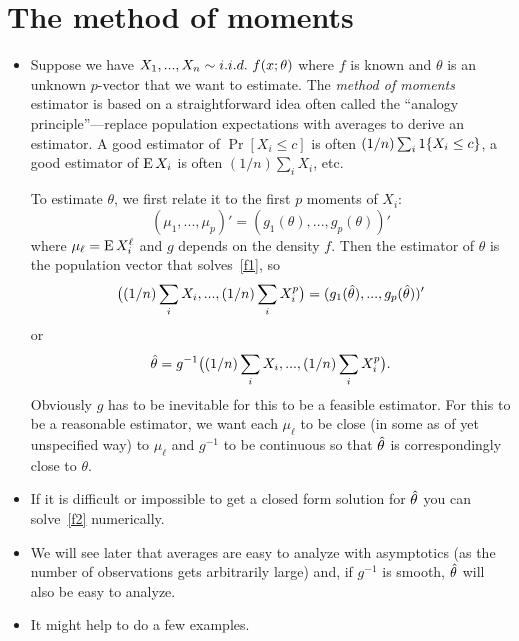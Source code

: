 \section{The method of moments}

\begin{itemize}
\item Suppose we have $X_1,...,X_n \sim \iid\ f(x; \theta)$ where $f$ is known
  and $\theta$ is an unknown $p$-vector that we want to estimate.  The
  \emph{method of moments} estimator is based on a straightforward
  idea often called the ``analogy principle''---replace population
  expectations with averages to derive an estimator.  A good estimator
  of $\Pr[X_i \leq c]$ is often $(1/n) \sum_i \operatorname{1}\{X_i \leq c\}$, a good
  estimator of $\operatorname{E} X_i$ is often $(1/n) \sum_i X_i$, etc.

  To estimate $\theta$, we first relate it to the first $p$ moments of
  $X_i$:
  \begin{equation}\label{f1}
    (\mu_1,...,\mu_p)' = (g_1(\theta),...,g_p(\theta))'
  \end{equation}
  where $\mu_\ell = \operatorname{E} X_i^\ell$ and $g$ depends on the density $f$.  Then the
  estimator of $\theta$ is the population vector that solves~\eqref{f1},
  so
  \begin{equation}\label{f2}
    \big((1/n) \sum_i X_i,...,(1/n) \sum_i X_i^p\big)
    = (g_1(\thetah),...,g_p(\thetah))'
  \end{equation}
  or
  \begin{equation*}
    \hat{\theta} = g^{-1}\big((1/n) \sum_i X_i,...,(1/n) \sum_i X_i^p\big).
  \end{equation*}
  Obviously $g$ has to be inevitable for this to be a feasible
  estimator.  For this to be a reasonable estimator, we want each
  $\mu_\ell$ to be close (in some as of yet unspecified way) to $\mu_\ell$ and
  $g^{-1}$ to be continuous so that $\hat{\theta}$ is correspondingly close to
  $\theta$.

\item If it is difficult or impossible to get a closed form solution
  for $\hat{\theta}$ you can solve~\eqref{f2} numerically.

\item We will see later that averages are easy to analyze with
  asymptotics (as the number of observations gets arbitrarily large)
  and, if $g^{-1}$ is smooth, $\hat{\theta}$ will also be easy to analyze.

\item It might help to do a few examples.


\end{itemize}

